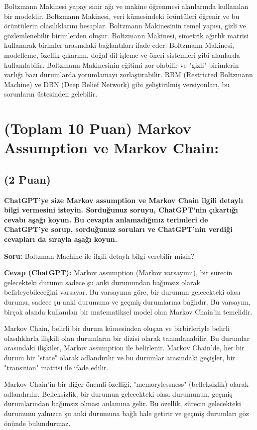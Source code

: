 \documentclass[11pt]{article}
\begin{document}
Boltzmann Makinesi yapay sinir ağı ve makine öğrenmesi alanlarında kullanılan bir modeldir. Boltzmann Makinesi, veri kümesindeki örüntüleri öğrenir ve bu örüntülerin olasılıklarını hesaplar. Boltzmann Makinesinin temel yapısı, gizli ve gözlemlenebilir birimlerden oluşur. Boltzmann Makinesi, simetrik ağırlık matrisi kullanarak birimler arasındaki bağlantıları ifade eder. Boltzmann Makinesi, modelleme, özellik çıkarımı, doğal dil işleme ve öneri sistemleri gibi alanlarda kullanılabilir. Boltzmann Makinesinin eğitimi zor olabilir ve "gizli" birimlerin varlığı bazı durumlarda yorumlamayı zorlaştırabilir. RBM (Restricted Boltzmann Machine) ve DBN (Deep Belief Network) gibi geliştirilmiş versiyonları, bu sorunların üstesinden gelebilir.

\section{(Toplam 10 Puan) Markov Assumption ve Markov Chain:}

\subsection{(2 Puan)} \textbf{ChatGPT’ye size Markov assumption ve Markov Chain ilgili detaylı bilgi vermesini isteyin. Sorduğunuz soruyu, ChatGPT'nin çıkartığı cevabı aşağı koyun. Bu cevapta anlamadığınız terimleri de ChatGPT’ye sorup, sorduğunuz soruları ve ChatGPT’nin verdiği cevapları da sırayla aşağı koyun.}

\textbf{Soru:} Boltzman Machine ile ilgili detaylı bilgi verebilir misin?

\textbf{Cevap (ChatGPT):}
Markov assumption (Markov varsayımı), bir sürecin gelecekteki durumu sadece şu anki durumundan bağımsız olarak belirleyebileceğini varsayar. Bu varsayıma göre, bir durumun gelecekteki olası durumu, sadece şu anki durumuna ve geçmiş durumlarına bağlıdır. Bu varsayım, birçok alanda kullanılan bir matematiksel model olan Markov Chain'in temelidir.

Markov Chain, belirli bir durum kümesinden oluşan ve birbirleriyle belirli olasılıklarla ilişkili olan durumların bir dizisi olarak tanımlanabilir. Bu durumlar arasındaki ilişkiler, Markov assumption ile belirlenir. Markov Chain'de, her bir durum bir "state" olarak adlandırılır ve bu durumlar arasındaki geçişler, bir "transition" matrisi ile ifade edilir.

Markov Chain'in bir diğer önemli özelliği, "memorylessness" (belleksizlik) olarak adlandırılır. Belleksizlik, bir durumun gelecekteki olası durumunun, geçmiş durumlarından bağımsız olması anlamına gelir. Bu özellik, sürecin gelecekteki durumunu yalnızca şu anki durumuna bağlı hale getirir ve geçmiş durumları göz önünde bulundurmaz.
\end{document}
